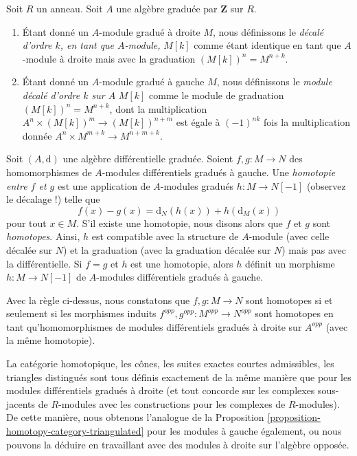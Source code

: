 \begin{definition}
\label{definition-shift-graded-module}
Soit $R$ un anneau. Soit $A$ une algèbre graduée par $\mathbf{Z}$ sur $R$.
\begin{enumerate}
\item Étant donné un $A$-module gradué à droite $M$, nous définissons le {\it
décalé d'ordre $k$, en tant que $A$-module,} $M[k]$ comme étant identique en tant que $A$-module à
droite mais avec la graduation $(M[k])^n = M^{n + k}$.
\item Étant donné un $A$-module gradué à gauche $M$, nous définissons le {\it
module décalé d'ordre $k$ sur $A$} $M[k]$ comme le module de graduation $(M[k])^n =
M^{n + k}$, dont la multiplication $A^n \times (M[k])^m \to (M[k])^{n + m}$ est égale à
$(-1)^{nk}$ fois la multiplication donnée $A^n \times M^{m + k} \to M^{n
+ m + k}$.
\end{enumerate}
\end{definition}

\noindent
Soit $(A, \text{d})$ une algèbre différentielle graduée. Soient $f, g : M \to N$
des homomorphismes de $A$-modules différentiels gradués à gauche. Une {\it
homotopie entre $f$ et $g$} est une application de $A$-modules gradués $h : M \to
N[-1]$ (observez le décalage !) telle que
$$
f(x) - g(x) = \text{d}_N(h(x)) + h(\text{d}_M(x))
$$
pour tout $x \in M$. S'il existe une homotopie, nous disons alors que $f$ et $g$
sont {\it homotopes}. Ainsi, $h$ est compatible avec la structure de $A$-module
(avec celle décalée sur $N$) et la graduation (avec la graduation décalée sur $N$)
mais pas avec la différentielle. Si $f = g$ et $h$ est une homotopie, alors $h$
définit un morphisme $h : M \to N[-1]$ de $A$-modules différentiels gradués
à gauche.

\medskip\noindent
Avec la règle ci-dessus, nous constatons que $f, g : M \to N$ sont homotopes si
et seulement si les morphismes induits $f^{opp}, g^{opp} : M^{opp} \to N^{opp}$
sont homotopes en tant qu'homomorphismes de modules différentiels gradués à
droite sur $A^{opp}$ (avec la même homotopie).

\medskip\noindent
La catégorie homotopique, les cônes, les suites exactes courtes admissibles, les
triangles distingués sont tous définis exactement de la même manière que pour les
modules différentiels gradués à droite (et tout concorde sur les complexes
sous-jacents de $R$-modules avec les constructions pour les complexes de
$R$-modules). De cette manière, nous obtenons l'analogue de la Proposition
\ref{proposition-homotopy-category-triangulated} pour les modules à gauche
également, ou nous pouvons la déduire en travaillant avec des modules à droite sur
l'algèbre opposée.



